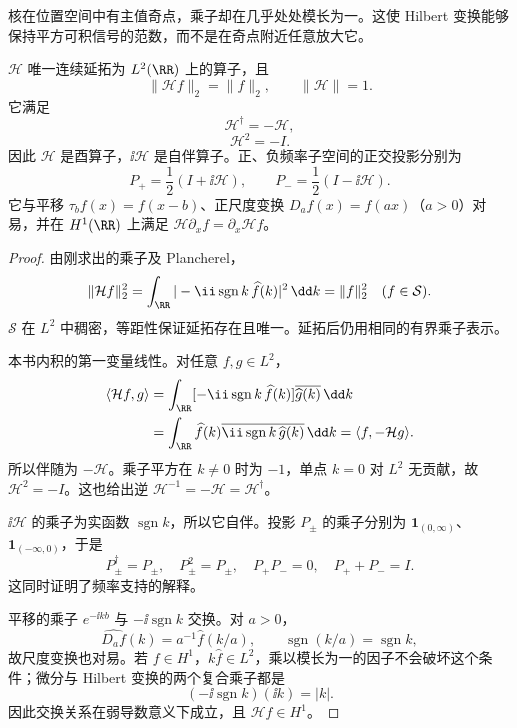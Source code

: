 核在位置空间中有主值奇点，乘子却在几乎处处模长为一。这使 Hilbert 变换能够保持平方可积信号的范数，而不是在奇点附近任意放大它。
\begin{theorem}
$\mathcal H$ 唯一连续延拓为 $L^2(\RR)$ 上的算子，且
\[
\|\mathcal Hf\|_2=\|f\|_2,\qquad \|\mathcal H\|=1.
\]
它满足
\begin{equation}
\mathcal H^\dagger=-\mathcal H,
\label{eq:hilbert-skew-adjoint}
\end{equation}
\begin{equation}
\mathcal H^2=-I.
\label{eq:hilbert-square}
\end{equation}
因此 $\mathcal H$ 是酉算子，$\ii\mathcal H$ 是自伴算子。正、负频率子空间的正交投影分别为
\[
P_+=\frac12(I+\ii\mathcal H),\qquad
P_-=\frac12(I-\ii\mathcal H).
\]
它与平移 $\tau_bf(x)=f(x-b)$、正尺度变换 $D_af(x)=f(ax)$（$a>0$）对易，并在 $H^1(\RR)$ 上满足 $\mathcal H\partial_xf=\partial_x\mathcal Hf$。
\end{theorem}
\begin{proof}
由刚求出的乘子及 Plancherel，
\[
\|\mathcal Hf\|_2^2
=\int_{\RR}|-\ii\operatorname{sgn}k\,\widehat f(k)|^2\,\dd k
=\|f\|_2^2\quad(f\in\mathcal S).
\]
$\mathcal S$ 在 $L^2$ 中稠密，等距性保证延拓存在且唯一。延拓后仍用相同的有界乘子表示。

本书内积的第一变量线性。对任意 $f,g\in L^2$，
\begin{align*}
\langle\mathcal Hf,g\rangle
&=\int_{\RR}[-\ii\operatorname{sgn}k\,\widehat f(k)]
\overline{\widehat g(k)}\,\dd k\\
&=\int_{\RR}\widehat f(k)
\overline{\ii\operatorname{sgn}k\,\widehat g(k)}\,\dd k
=\langle f,-\mathcal Hg\rangle.
\end{align*}
所以伴随为 $-\mathcal H$。乘子平方在 $k\ne0$ 时为 $-1$，单点 $k=0$ 对 $L^2$ 无贡献，故 $\mathcal H^2=-I$。这也给出逆 $\mathcal H^{-1}=-\mathcal H=\mathcal H^\dagger$。

$\ii\mathcal H$ 的乘子为实函数 $\operatorname{sgn}k$，所以它自伴。投影 $P_\pm$ 的乘子分别为 $\mathbf1_{(0,\infty)}$、$\mathbf1_{(-\infty,0)}$，于是
\[
P_\pm^\dagger=P_\pm,\quad P_\pm^2=P_\pm,
\quad P_+P_-=0,\quad P_++P_-=I.
\]
这同时证明了频率支持的解释。

平移的乘子 $e^{-\ii kb}$ 与 $-\ii\operatorname{sgn}k$ 交换。对 $a>0$，
\[
\widehat{D_af}(k)=a^{-1}\widehat f(k/a),
\qquad \operatorname{sgn}(k/a)=\operatorname{sgn}k,
\]
故尺度变换也对易。若 $f\in H^1$，$k\widehat f\in L^2$，乘以模长为一的因子不会破坏这个条件；微分与 Hilbert 变换的两个复合乘子都是
\[
(-\ii\operatorname{sgn}k)(\ii k)=|k|.
\]
因此交换关系在弱导数意义下成立，且 $\mathcal Hf\in H^1$。
\end{proof}

